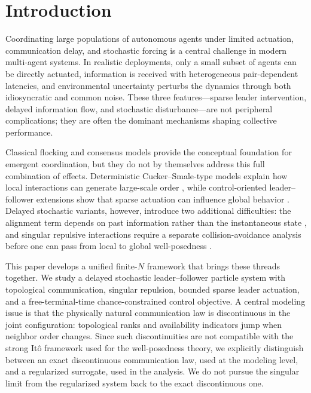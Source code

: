 \documentclass[pdflatex,sn-mathphys-num]{sn-jnl}%
\numberwithin{equation}{section}
\theoremstyle{thmstyleone}%
\theoremstyle{remark}
\theoremstyle{definition}
\begin{document}

\maketitle

\tableofcontents

\section{Introduction}
\label{sec:intro}
Coordinating large populations of autonomous agents under limited actuation,
communication delay, and stochastic forcing is a central challenge in modern
multi-agent systems. In realistic deployments, only a small subset of agents
can be directly actuated, information is received with heterogeneous
pair-dependent latencies, and environmental uncertainty perturbs the
dynamics through both idiosyncratic and common noise. These three
features---sparse leader intervention, delayed information flow, and
stochastic disturbance---are not peripheral complications; they are often the
dominant mechanisms shaping collective performance.

Classical flocking and consensus models provide the conceptual foundation for
emergent coordination, but they do not by themselves address this full
combination of effects. Deterministic Cucker--Smale-type models explain how
local interactions can generate large-scale order
\cite{cucker2007emergent,cucker2007mathematics,ha2009simple,motsch2011new,
motsch2014heterophilious}, while control-oriented leader--follower
extensions show that sparse actuation can influence global behavior
\cite{caponigro2013sparse,caponigro2015sparse,fornasier2014mean,
borzi2015modeling,albi2014boltzmann,bongini2017mean}. Delayed stochastic
variants, however, introduce two additional difficulties: the alignment term
depends on past information rather than the instantaneous state
\cite{erban2016cucker,choi2017cucker,pignotti2018convergence,liu2014flocking},
and singular repulsive interactions require a separate collision-avoidance
analysis before one can pass from local to global well-posedness
\cite{cucker2010avoiding,park2010cucker,carrillo2017sharp}. 

This paper develops a unified finite-$N$ framework that brings these threads
together. We study a delayed stochastic leader--follower particle system with
topological communication, singular repulsion, bounded sparse leader
actuation, and a free-terminal-time chance-constrained control objective. A
central modeling issue is that the physically natural communication law is
discontinuous in the joint configuration: topological ranks and availability
indicators jump when neighbor order changes. Since such discontinuities are
not compatible with the strong It\^o framework used for the well-posedness
theory, we explicitly distinguish between an exact discontinuous
communication law, used at the modeling level, and a regularized
surrogate, used in the analysis. We do not pursue the singular limit from
the regularized system back to the exact discontinuous one.
\end{document}
